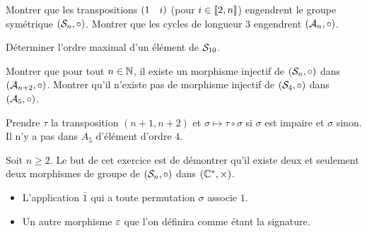 \documentclass{magnolia}
\begin{document}
\begin{questions}
\question Montrer que les transpositions $\left(1\quad i\right)$ (pour
  $i\in\left\llbracket 2,n\right\rrbracket$) engendrent le groupe symétrique $(\mathcal{S}_{n}, \circ)$.
\question Montrer que les cycles de longueur $3$ engendrent $(\mathcal{A}_{n},\circ)$.
\end{questions}

Déterminer l'ordre maximal d'un élément de $\mathcal{S}_{10}$.

\begin{questions}
\question Montrer que pour tout $n\in\mathbb{N}$, il existe un morphisme injectif de
  $(\mathcal{S}_{n},\circ)$ dans $(\mathcal{A}_{n+2},\circ)$.
\question Montrer qu'il n'existe pas de morphisme injectif de $(\mathcal{S}_{4},\circ)$
  dans $(\mathcal{A}_{5},\circ)$.
\end{questions}
\begin{sol}
Prendre $\tau$ la transposition $(n+1,n+2)$ et $\sigma \mapsto
\tau \circ \sigma$ si $\sigma$ est impaire et $\sigma$ sinon.\\
Il n'y a pas dans $A_5$ d'élément d'ordre $4$.
\end{sol}

Soit $n\geq2$. Le but de cet exercice est de démontrer qu'il existe deux
et seulement deux morphismes de groupe de $(\mathcal{S}_{n},\circ)$ dans
$(\mathbb{C}^*,\times)$.
\begin{itemize}
\item L'application $\bar{1}$ qui a toute permutation $\sigma$ associe $1$.
\item Un autre morphisme $\signature$ que l'on définira comme étant la
  signature.
\end{itemize}
\end{document}
